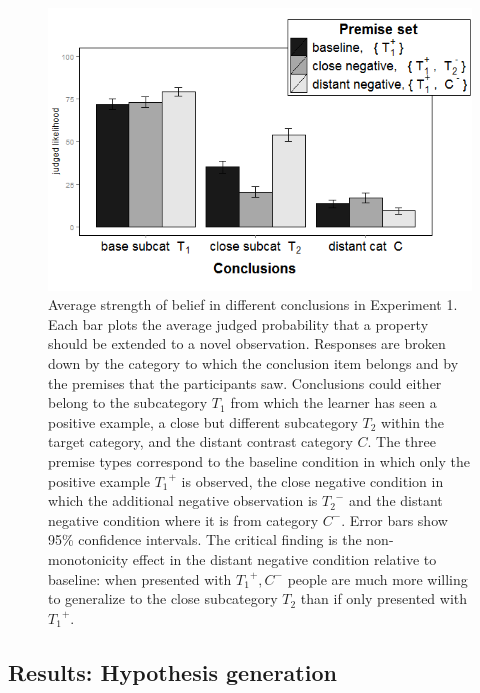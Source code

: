 \documentclass[authoryear,11pt]{elsarticle}
\begin{document}
\begin{figure}[t!]
\begin{center}
\includegraphics[trim=0cm 0cm 0cm 0cm, clip=true, scale=.5]{fig/exp1_gen_all.png}
\end{center}
\vspace{-8mm}
\caption{\small Average strength of belief in different conclusions in Experiment 1. Each bar plots the average judged probability that a property should be extended to a novel observation. Responses are broken down by the category to which the conclusion item belongs and by the premises that the participants saw. Conclusions could either belong to the subcategory $T_1$ from which the learner has seen a positive example, a close but different subcategory $T_2$ within the target category, and the distant contrast category $C$. The three premise types correspond to the {\sc baseline} condition in which only the positive example ${T_1}^+$ is observed, the {\sc close negative} condition in which the additional negative observation is ${T_2}^-$ and the {\sc distant negative} condition where it is from category $C^-$. Error bars show 95\% confidence intervals. The critical finding is the non-monotonicity effect in the {\sc distant negative} condition relative to {\sc baseline}: when presented with ${T_1}^+,C^-$ people are much more willing to generalize to the close subcategory $T_2$ than if only presented with ${T_1}^+$. \normalsize}
\label{fig:exp1me}
\end{figure}

\subsection{Results: Hypothesis generation}
\end{document}
